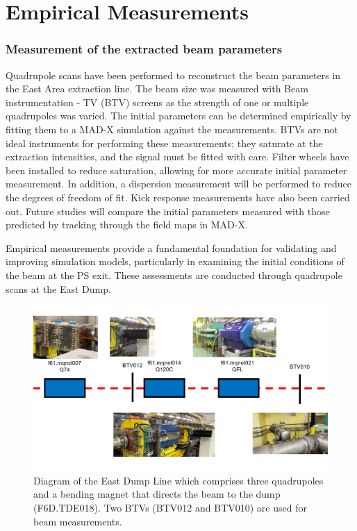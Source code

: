 \section{Empirical Measurements}
\label{section:Empirical_measurements}


\subsubsection{Measurement of the extracted beam parameters}

Quadrupole scans have been performed to reconstruct the beam parameters in the East Area extraction line. The beam size was measured with Beam instrumentation - TV (BTV) screens as the strength of one or multiple quadrupoles was varied. The initial parameters can be determined empirically by fitting them to a MAD-X simulation against the measurements. BTVs are not ideal instruments for performing these measurements; they saturate at the extraction intensities, and the signal must be fitted with care. Filter wheels have been installed to reduce saturation, allowing for more accurate initial parameter measurement. In addition, a dispersion measurement will be performed to reduce the degrees of freedom of fit.
Kick response measurements have also been carried out. Future studies will compare the initial parameters measured with those predicted by tracking through the field maps in MAD-X.


Empirical measurements provide a fundamental foundation for validating and improving simulation models, particularly in examining the initial conditions of the beam at the PS exit. These assessments are conducted through quadrupole scans at the East Dump.

\begin{figure}[htbp]
\centering
\includegraphics[width=\linewidth]{03_Empirical_Measurements/images/East_dump_line.png}
\caption{Diagram of the East Dump Line which comprises three quadrupoles and a bending magnet that directs the beam to the dump (F6D.TDE018). Two BTVs (BTV012 and BTV010) are used for beam measurements.}
\label{fig:East_dump_line}
\end{figure}

